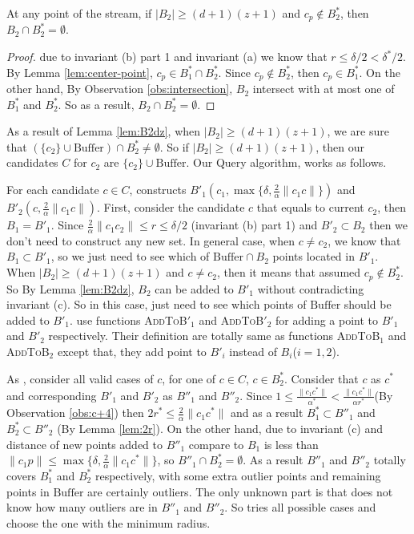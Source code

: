 \documentclass[envcountsame]{cls/cccg15}
\newcommand{\cp}{c_p}
\newcommand{\dz}{(d + 1)(z + 1)}
\newcommand{\Buffer}{\ensuremath{\text{Buffer}}}
\newcommand{\textproc}{\textsc}
\newcommand{\len}[1]{\|{#1}\|}
\newcommand{\radius}[1]{\frac{2}{\alpha} \len{c_1 #1}}
\newcommand{\lee}{\leqslant}
\newcommand{\gee}{\geqslant}
\renewcommand{\leq}{\lee}
\renewcommand{\geq}{\gee}
\renewcommand{\ge}{\gee}
\begin{document}
\begin{lemma}
\label{lem:B2dz}
	At any point of the stream, 
	if $|B_2| \ge \dz$ and $\cp \not\in B_2^*$,
	then $B_2 \cap B_2^* = \emptyset$.
\end{lemma}

\begin{proof}
	due to invariant (b) part 1 and invariant (a) we know that $r \leq \delta/2 < \delta^*/2$. 
	By Lemma \ref{lem:center-point}, $c_p \in B_1^* \cap B_2^*$. 
	Since $c_p \not \in B_2^*$, then $c_p \in B_1^*$. 
	On the other hand, By Observation \ref{obs:intersection}, $B_2$ intersect with at most one of $B_1^*$ and $B_2^*$. So as a result, $B_2 \cap B_2^* = \emptyset$.
\end{proof}

As a result of Lemma \ref{lem:B2dz}, when $|B_2| \geq \dz$, we are sure that $(\{c_2\} \cup \Buffer) \cap B_2^* \neq \emptyset$. 
So if $|B_2| \ge \dz$, then our candidates $C$ for $c_2$ are $\{c_2\} \cup \Buffer$. Our Query algorithm, works as follows. 

For each candidate $c \in C$,  constructs $B'_1(c_1, \max \{\delta, \radius{c} \})$ and $B'_2(c, \radius{c})$. 
First, consider the candidate $c$ that equals to current $c_2$, then $B_1 = B'_1$. 
Since $\radius{c_2} \leq r \leq \delta/2$ (invariant (b) part 1) and $B'_2 \subset B_2$ then we don't need to construct any new set. 
In general case, when $c \neq c_2$, we know that $B_1 \subset B'_1$, so we just need to see which of $\Buffer \cap B_2$ points located in $B'_1$.
When $|B_2| \geq \dz$ and $c \neq c_2$, then it means that assumed $c_p \not \in B_2^*$. So By Lemma \ref{lem:B2dz}, $B_2$ can be added to $B'_1$ without contradicting invariant (c). 
So in this case, just need to see which points of $\Buffer$ should be added to $B'_1$. 
 use functions \textproc{AddToB$'_1$} and \textproc{AddToB$'_2$} for adding a point to $B'_1$ and $B'_2$ respectively. 
Their definition are totally same as functions \textproc{AddToB$_1$} and \textproc{AddToB$_2$} except that, they add point to $B'_i$ instead of $B_i$($i = 1, 2$).

As , consider all valid cases of $c$, for one of $c \in C$, $c \in B_2^*$. 
Consider that $c$ as $c^*$ and corresponding $B'_1$ and $B'_2$ as $B''_1$ and $B''_2$. 
Since $1 \leq \frac{\len{c_1 c^*}}{\alpha^*} < \frac{\len {c_1 c^*}}{\alpha r^*}$(By Observation \ref{obs:c+4}) then $2r^* \leq \radius{c^*}$ and as a result $B^*_1 \subset B''_1$ and $B^*_2 \subset B''_2$ (By Lemma \ref{lem:2r}).
On the other hand, due to invariant (c) and distance of new points added to $B''_1$ compare to $B_1$ is less than $\len{c_1 p} \leq \max \{\delta, \radius{c^*} \}$, so $B''_1 \cap B_2^* = \emptyset$.
As a result $B''_1$ and $B''_2$ totally covers $B_1^*$  and $B_2^*$ respectively, with some extra outlier points and remaining points in $\Buffer$ are certainly outliers.
The only unknown part is that  does not know how many outliers are in $B''_1$ and $B''_2$.
So  tries all possible cases and choose the one with the minimum radius.
\end{document}
